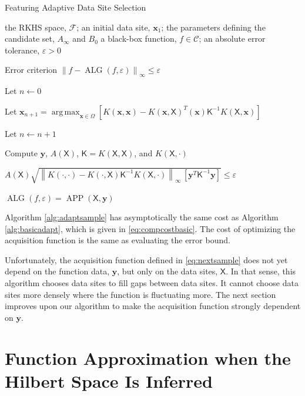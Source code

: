\documentclass[]{mcom-l}
\theoremstyle{remark}
\DeclareMathOperator*{\argmax}{arg\,max}
\DeclareMathOperator{\ALG}{ALG}
\DeclareMathOperator{\APP}{APP}
\newcommand{\mK}{\mathsf{K}}
\newcommand{\mX}{\mathsf{X}}
\newcommand{\bx}{{\boldsymbol{x}}}
\newcommand{\by}{{\boldsymbol{y}}}
\newcommand{\cc}{\mathcal{C}}
\newcommand{\calf}{{\mathcal{F}}}
\newcommand{\norm}[2][{}]{\ensuremath{\left \lVert #2 \right \rVert}_{#1}}
\begin{document}
\begin{algorithm}[H]
	\caption{Featuring Adaptive Data Site Selection \label{alg:adaptsample}}
	\begin{algorithmic}
		\PARAM the RKHS space, $\calf$; an initial data site, $\bx_1$; the parameters defining the candidate set, $A_\infty$ and $B_0$
		\INPUT a black-box function, $f \in \cc$; an absolute error tolerance, $\varepsilon>0$
		
		\Ensure Error criterion $\norm[\infty]{f - \ALG(f,\varepsilon)} \le \varepsilon$
		
		\State Let $n \leftarrow 0$
		
		\Repeat
		
		
		\State Let $ \bx_{n+1} = \displaystyle \argmax_{\bx \in \Omega} [K(\bx,\bx) - K(\bx,\mX)^T(\bx) \mK^{-1} K(\mX,\bx)]$
		
		\EndIf
		
		\State Let $n \leftarrow n + 1$
		
		\State Compute $\by$, $A(\mX)$, $\mK = K(\mX,\mX)$, and $K(\mX,\cdot)$
		
		\Until $A(\mX) \sqrt{\norm[\infty]{K(\cdot,\cdot) - K(\cdot,\mX) \mK^{-1} K(\mX,\cdot)} \, [\by^T \mK^{-1} \by] }  \le \varepsilon$
		
		\RETURN $\ALG(f,\varepsilon) = \APP(\mX,\by)$
		
	\end{algorithmic}
\end{algorithm}

Algorithm \ref{alg:adaptsample} has asymptotically the same cost as Algorithm \ref{alg:basicadapt}, which is given in \eqref{eq:compcostbasic}.  The cost of optimizing the acquisition function is the same as evaluating the error bound.

Unfortunately, the acquisition function defined in \eqref{eq:nextsample} does not yet depend on the function data, $\by$, but only on the data sites, $\mX$.  In that sense, this algorithm chooses data sites to fill gaps between data sites.  It cannot choose data sites more densely where the function is fluctuating more.  The next section improves upon our algorithm to make the acquisition function strongly dependent on $\by$.





\section{Function Approximation when the Hilbert Space Is Inferred} \label{sec:adaptF}
\end{document}
